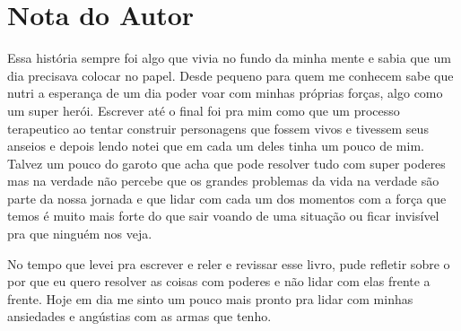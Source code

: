 \chapter*{Nota do Autor}
Essa história sempre foi algo que vivia no fundo da minha mente e sabia que um dia precisava colocar no papel. Desde pequeno para quem me conhecem sabe que nutri a esperança de um dia poder voar com minhas próprias forças, algo como um super herói. Escrever até o final foi pra mim como que um processo terapeutico ao tentar construir personagens que fossem vivos e tivessem seus anseios e depois lendo notei que em cada um deles tinha um pouco de mim. Talvez um pouco do garoto que acha que pode resolver tudo com super poderes mas na verdade não percebe que os grandes problemas da vida na verdade são parte da nossa jornada e que lidar com cada um dos momentos com a força que temos é muito mais forte do que sair voando de uma situação ou ficar invisível pra que ninguém nos veja.

No tempo que levei pra escrever e reler e revissar esse livro, pude refletir sobre o por que eu quero resolver as coisas com poderes e não lidar com elas frente a frente. Hoje em dia me sinto um pouco mais pronto pra lidar com minhas ansiedades e angústias com as armas que tenho.



  
  
  
  


